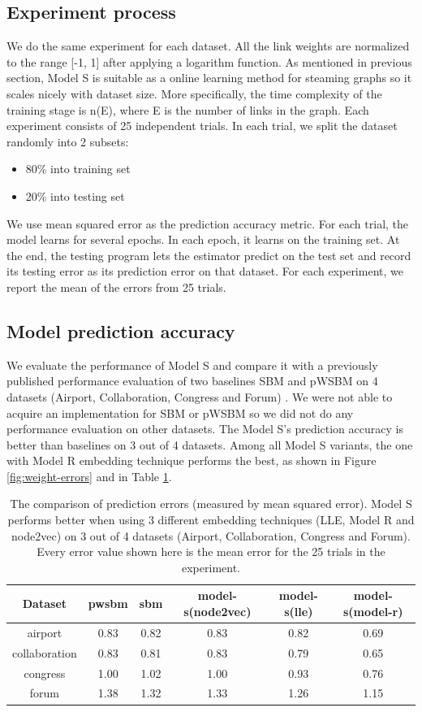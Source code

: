 \documentclass[12pt]{WSUThesis}
\theoremstyle{definition}
\begin{document}
\subsection{Experiment process}
We do the same experiment for each dataset.
All the link weights are normalized to the range [-1, 1] after applying a logarithm function.
As mentioned in previous section, Model S is suitable as a online learning method for steaming graphs so it scales nicely with dataset size.
More specifically, the time complexity of the training stage is n(E), where E is the number of links in the graph.
Each experiment consists of 25 independent trials.
In each trial, we split the dataset randomly into 2 subsets:
\begin{itemize}
	\item 80\% into training set
	\item 20\% into testing set
\end{itemize}
We use mean squared error as the prediction accuracy metric.
For each trial, the model learns for several epochs.
In each epoch, it learns on the training set.
At the end, the testing program lets the estimator predict on the test set 
and record its testing error as its prediction error on that dataset.
For each experiment, we report the mean of the errors from 25 trials.

\subsection{Model prediction accuracy}
We evaluate the performance of Model S and compare it with a previously published performance evaluation of two baselines SBM and pWSBM on 4 datasets (Airport, Collaboration, Congress and Forum) \citep{aicher2014learning}.
We were not able to acquire an implementation for SBM or pWSBM so we did not do any performance evaluation on other datasets.
The Model S's prediction accuracy is better than baselines on 3 out of 4 datasets.
Among all Model S variants,
the one with Model R embedding technique performs the best,
as shown in Figure \ref{fig:weight-errors} and in Table \ref{tab:weight-errors}.

\begin{table}[!htb]
	\centering
	\caption{
		The comparison of prediction errors (measured by mean squared error).
		Model S performs better when using 3 different embedding techniques (LLE, Model R and node2vec) on 3 out of 4 datasets (Airport, Collaboration, Congress and Forum).
		Every error value shown here is the mean error for the 25 trials in the experiment.
	}
	\begin{tabular}{cccccc} \hline
		Dataset & pwsbm & sbm & model-s(node2vec) & model-s(lle) & model-s(model-r) \\ \hline
		airport & 0.83 & 0.82 & 0.83 & 0.82 & 0.69 \\ \hline
		collaboration & 0.83 & 0.81 & 0.83 & 0.79 & 0.65 \\ \hline
		congress & 1.00 & 1.02 & 1.00 & 0.93 & 0.76 \\ \hline
		forum & 1.38 & 1.32 & 1.33 & 1.26 & 1.15 \\ \hline
	\end{tabular}
	\label{tab:weight-errors}
\end{table}
\end{document}
